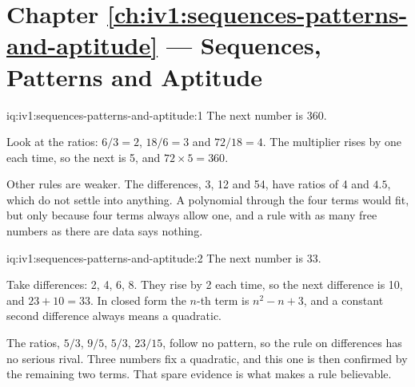 \section*{Chapter \ref{ch:iv1:sequences-patterns-and-aptitude} --- Sequences, Patterns and Aptitude}

\begin{solution}{iq:iv1:sequences-patterns-and-aptitude:1}
The next number is 360.

Look at the ratios: $6/3 = 2$, $18/6 = 3$ and $72/18 = 4$. The multiplier rises by one each time, so the next is 5, and $72 \times 5 = 360$.

Other rules are weaker. The differences, 3, 12 and 54, have ratios of 4 and $4.5$, which do not settle into anything. A polynomial through the four terms would fit, but only because four terms always allow one, and a rule with as many free numbers as there are data says nothing.

\end{solution}

\begin{solution}{iq:iv1:sequences-patterns-and-aptitude:2}
The next number is 33.

Take differences: 2, 4, 6, 8. They rise by 2 each time, so the next difference is 10, and $23 + 10 = 33$. In closed form the $n$-th term is $n^2 - n + 3$, and a constant second difference always means a quadratic.

The ratios, $5/3$, $9/5$, $5/3$, $23/15$, follow no pattern, so the rule on differences has no serious rival. Three numbers fix a quadratic, and this one is then confirmed by the remaining two terms. That spare evidence is what makes a rule believable.

\end{solution}

